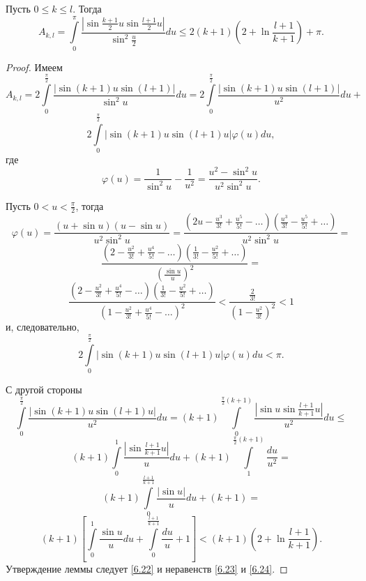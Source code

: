 \begin{lemma}\label{l6.2}
  Пусть $0\le k\le l$. Тогда
$$A_{k,l}=\int\limits_{0}^{\pi}\frac{|\sin\frac{k+1}{2}u\sin\frac{l+1}{2}u|}
{\sin^2\frac u2}du\le2(k+1)(2+\ln\frac{l+1}{k+1})+\pi.$$
\end{lemma}
\begin{proof} Имеем
$$
A_{k,l}=2\int\limits_{0}^{\frac\pi2}\frac{|\sin(k+1)u\sin(l+1)|}{\sin^2u}du=
2\int\limits_{0}^{\frac\pi2}\frac{|\sin(k+1)u\sin(l+1)|}{u^2}du+
$$
\begin{equation}\label{6.22}
2\int\limits_{0}^{\frac\pi2}|\sin(k+1)u\sin(l+1)u|\varphi(u)du,
   \end{equation}
где
$$
\varphi(u)=\frac{1}{\sin^2u}-\frac{1}{u^2}=\frac{u^2-\sin^2u}{u^2\sin^2u}.
$$

Пусть $0<u<\frac\pi2$, тогда
$$
\varphi(u)=\frac{(u+\sin u)(u-\sin u)}{u^2\sin^2u}=
\frac{(2u-\frac{u^3}{3!}+\frac{u^5}{5!}-\ldots)(\frac{u^3}{3!}-\frac{u^5}{5!}+\ldots)}{u^2\sin^2u}=
$$
$$
\frac{(2-\frac{u^2}{3!}+\frac{u^4}{5!}-\ldots)
(\frac{1}{3!}-\frac{u^2}{5!}+\ldots)}{\left(\frac{\sin u}
{u}\right)^2}=
$$
$$
\frac{(2-\frac{u^2}{3!}+\frac{u^4}{5!}-\ldots)(\frac{1}{3!}-
\frac{u^2}{5!}+\ldots)}{(1-\frac{u^2}{3!}+\frac{u^4}{5!}-\ldots)^2}
<\frac{\frac{2}{3!}}{\left(1-\frac{u^2}{3!}\right)^2}<1
$$
и, следовательно,
\begin{equation}\label{6.23}
 2\int\limits_{0}^{\frac\pi2}|\sin(k+1)u\sin(l+1)u|\varphi(u)du<\pi.
\end{equation}

С другой стороны
$$\int\limits_{0}^{\frac\pi2}\frac{|\sin(k+1)u\sin(l+1)u|}{u^2}du=
(k+1)\int\limits_{0}^{\frac\pi2(k+1)}\frac{|\sin u \sin\frac{l+1}{k+1}u|}{u^2}du\le
$$
$$(k+1)\int\limits_{0}^{1}\frac{|\sin\frac{l+1}{k+1}u|}{u}du+
(k+1)\int\limits_{1}^{\frac\pi2(k+1)}\frac{du}{u^2}=
$$
$$
(k+1)\int\limits_{0}^{\frac{l+1}{k+1}}\frac{|\sin u|}{u}du+
(k+1)=
$$
\begin{equation}\label{6.24}
    (k+1)\left[\int\limits_{0}^{1}\frac{\sin u}{u}du+
\int\limits_{0}^{\frac{l+1}{k+1}}\frac{du}{u}+1\right]<
(k+1)\left(2+\ln\frac{l+1}{k+1}\right).
\end{equation}
Утверждение леммы следует  \eqref{6.22} и неравенств \eqref{6.23} и \eqref{6.24}.
\end{proof}


